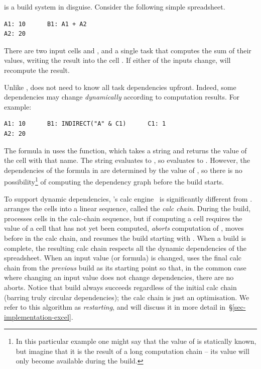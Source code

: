 \Excel is a build system in disguise. Consider the following simple spreadsheet.

\vspace{1mm}
\begin{verbatim}
A1: 10      B1: A1 + A2
A2: 20
\end{verbatim}
\vspace{1mm}

\noindent
There are two input cells  and , and a single task that computes
the sum of their values, writing the result into the cell . If either of
the inputs change, \Excel will recompute the result.

Unlike \Make, \Excel does not need to know all task dependencies upfront. Indeed, some
dependencies may change \emph{dynamically} according to computation results. For
example:

\vspace{1mm}
\begin{verbatim}
A1: 10      B1: INDIRECT("A" & C1)      C1: 1
A2: 20
\end{verbatim}
\vspace{1mm}

\noindent
The formula in  uses the  function, which takes a string
and returns the value of the cell with that name.  The string evaluates to
, so  evaluates to . However, the dependencies of the
formula in  are determined by the value of , so there is no
possibility\footnote{In this particular example one might say that the value of
 is statically known, but imagine that it is the result of a long
computation chain -- its value will only become available during the build.}
of computing the dependency graph before the build starts.

To support dynamic dependencies, \Excel's calc engine~\cite{excel_recalc} is
significantly different from \Make. \Excel arranges the cells into a linear
sequence, called the \emph{calc chain}.  During the build, \Excel processes
cells in the calc-chain sequence, but if computing a cell  requires the
value of a cell  that has not yet been computed, \Excel \emph{aborts}
computation of , moves  before  in the calc chain, and
resumes the build starting with . When a build is complete, the resulting
calc chain respects all the dynamic dependencies of the spreadsheet. When an
input value (or formula) is changed, \Excel uses the final calc chain from the
\emph{previous} build as its starting point so that, in the common case where
changing an input value does not change dependencies, there are no aborts.
Notice that build always succeeds regardless of the initial calc chain (barring
truly circular dependencies); the calc chain is just an optimisation.
We refer to this algorithm as \emph{restarting}, and will discuss it
in more detail in~\S\ref{sec-implementation-excel}.


